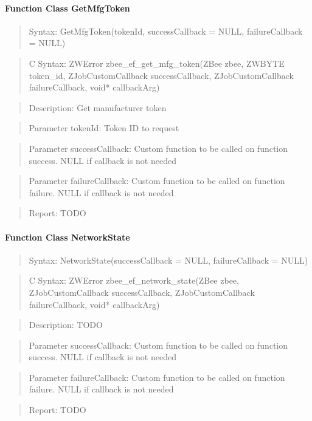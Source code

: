 \paragraph{Function Class GetMfgToken}
\begin{quote}Syntax: GetMfgToken(tokenId, successCallback = NULL, failureCallback = NULL)\end{quote}
\begin{quote}C Syntax: ZWError zbee\_ef\_get\_mfg\_token(ZBee zbee, ZWBYTE token\_id, ZJobCustomCallback successCallback, ZJobCustomCallback failureCallback, void* callbackArg)\end{quote}
\begin{quote}Description: Get manufacturer token\end{quote}
\begin{quote}Parameter tokenId: Token ID to request\end{quote}
\begin{quote}Parameter successCallback: Custom function to be called on function success. NULL if callback is not needed\end{quote}
\begin{quote}Parameter failureCallback: Custom function to be called on function failure. NULL if callback is not needed\end{quote}
\begin{quote}Report: TODO\end{quote}

\paragraph{Function Class NetworkState}
\begin{quote}Syntax: NetworkState(successCallback = NULL, failureCallback = NULL)\end{quote}
\begin{quote}C Syntax: ZWError zbee\_ef\_network\_state(ZBee zbee, ZJobCustomCallback successCallback, ZJobCustomCallback failureCallback, void* callbackArg)\end{quote}
\begin{quote}Description: TODO\end{quote}
\begin{quote}Parameter successCallback: Custom function to be called on function success. NULL if callback is not needed\end{quote}
\begin{quote}Parameter failureCallback: Custom function to be called on function failure. NULL if callback is not needed\end{quote}
\begin{quote}Report: TODO\end{quote}

